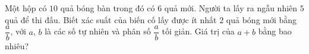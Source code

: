 \begin{ex}%
	Một hộp có $10$ quả bóng bàn trong đó có $6$ quả mới. Người ta lấy ra ngẫu nhiên $5$ quả để thi đấu. Biết xác suất của biến cố lấy được ít nhất $2$ quả bóng mới bằng $\dfrac{a}{b}$, với $a$, $b$ là các số tự nhiên và phân số $\dfrac{a}{b}$ tối giản. Giá trị của $a + b$ bằng bao nhiêu?
\end{ex}


